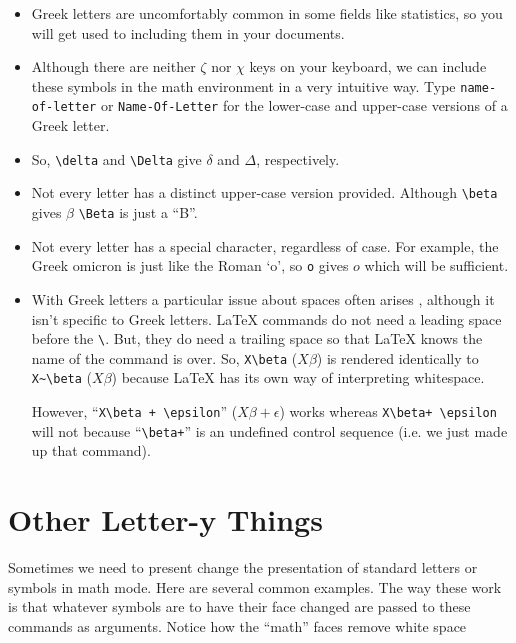 \begin{itemize}
\item Greek letters are uncomfortably common in some fields like statistics, so
  you will get used to including them in your documents.

\item Although there are neither $\zeta$ nor $\chi$ keys on your keyboard, we
  can include these symbols in the math environment in a very intuitive
  way. Type \verb=name-of-letter= or \verb=Name-Of-Letter= for the lower-case
  and upper-case versions of a Greek letter.

\item So, \verb=\delta= and \verb=\Delta= give $\delta$ and $\Delta$,
  respectively.

\item Not every letter has a distinct upper-case version provided. Although
  \verb=\beta= gives $\beta$ \verb=\Beta= is just a ``B''.

\item Not every letter has a special character, regardless of
  case. For example, the Greek omicron is just like the Roman `o', so
  \verb=o= gives $o$ which will be sufficient.

\item With Greek letters a particular issue about spaces often arises , although
  it isn't specific to Greek letters. \LaTeX{} commands do not need a leading
  space before the \verb=\=. But, they do need a trailing space so that \LaTeX{}
  knows the name of the command is over. So, \verb=X\beta= ($X\beta$) is
  rendered identically to \verb=X~\beta= ($X \beta$) because \LaTeX{} has its
  own way of interpreting whitespace.

  However, ``\verb=X\beta + \epsilon='' ($X\beta + \epsilon$) works whereas
  \verb=X\beta+ \epsilon= will not because ``\verb=\beta+='' is an undefined
  control sequence (i.e. we just made up that command).

\end{itemize}

\section{Other Letter-y Things}

Sometimes we need to present change the presentation of standard
letters or symbols in math mode. Here are several common examples. The
way these work is that whatever symbols are to have their face changed
are passed to these commands as arguments. Notice how the ``math''
faces remove white space

